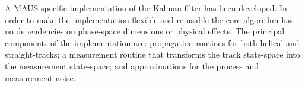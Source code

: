 % 



    A MAUS-specific implementation of the Kalman filter has been developed. In order to make the implementation flexible and re-usable the core algorithm has no dependencies on phase-space dimensions or physical effects. %
    The principal components of the implementation are: propagation routines for both helical and straight-tracks; a measurement routine that transforms the track state-space into the measurement state-space; and approximations for the process and measurement noise.
    
